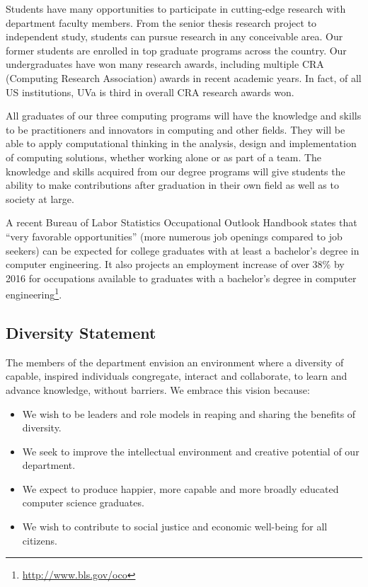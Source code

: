 \documentclass[10pt,letter,twocolumn]{book}
\newenvironment{itemlist}{
\begin{itemize}
\setlength{\itemsep}{0pt}
\setlength{\parskip}{0pt}}
{\end{itemize}}
\newcommand{\myurl}[1]{\footnote{\scriptsize\url{#1}}}
\begin{document}
Students have many opportunities to participate in cutting-edge research
with department faculty members. From the senior thesis research
project to independent study, students can pursue research in any
conceivable area. Our former students are enrolled in top graduate
programs across the country. Our undergraduates have won many research
awards, including multiple CRA (Computing Research Association)
awards in recent academic years. In fact, of all US
institutions, UVa is third in overall CRA research awards won.

All graduates of our three computing programs will have the knowledge
and skills to be practitioners and innovators in computing and other
fields.  They will be able to apply computational thinking in the
analysis, design and implementation of computing solutions, whether
working alone or as part of a team. The knowledge and skills acquired
from our degree programs will give students the ability to make
contributions after graduation in their own field as well as to
society at large.

A recent Bureau of Labor Statistics Occupational Outlook Handbook
states that ``very favorable opportunities'' (more numerous job
openings compared to job seekers) can be expected for college
graduates with at least a bachelor's degree in computer
engineering. It also projects an employment increase of over 38\% by
2016 for occupations available to graduates with a bachelor's degree
in computer engineering\myurl{http://www.bls.gov/oco}.

\subsection{Diversity Statement}

The members of the department envision an environment where a
diversity of capable, inspired individuals congregate, interact and
collaborate, to learn and advance knowledge, without barriers. We
embrace this vision because:

\begin{itemlist}
\item We wish to be leaders and role models in reaping and sharing the
 benefits of diversity.
\item We seek to improve the intellectual environment and creative
 potential of our department.
\item We expect to produce happier, more capable and more broadly
 educated computer science graduates.
\item We wish to contribute to social justice and economic well-being
 for all citizens.
\end{itemlist}
\end{document}
